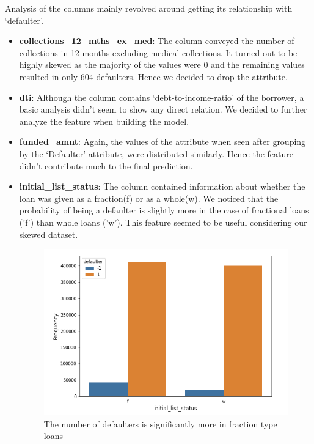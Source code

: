 \documentclass[conference]{IEEEtran}
\begin{document}
Analysis of the columns mainly revolved around getting its relationship with
`defaulter'.
\begin{itemize}
    \item {\bf collections\_12\_mths\_ex\_med}: The column conveyed the number
        of collections in 12 months excluding medical collections. It turned
        out to be highly skewed as the majority of the values were 0 and the
        remaining values resulted in only 604 defaulters. Hence we decided
        to drop the attribute.

    \item {\bf dti}: Although the column contains `debt-to-income-ratio' of
        the borrower, a basic analysis didn't seem to show any direct relation.
        We decided to further analyze the feature when building the model.

    \item {\bf funded\_amnt}: Again, the values of the attribute when seen
        after grouping by the ‘Defaulter’ attribute, were distributed similarly.
        Hence the feature didn’t contribute much to the final prediction.

    \item {\bf initial\_list\_status}: The column contained information about
        whether the loan was given as a fraction(f) or as a whole(w). We
        noticed that the probability of being a defaulter is slightly more in
        the case of fractional loans ('f') than whole loans ('w'). This feature
        seemed to be useful considering our skewed dataset.

        \begin{figure}[ht]
        \center\includegraphics[scale=0.3]{initial_list_status}
            \caption{The number of defaulters is significantly more in fraction type loans}
        \end{figure}


\end{itemize}
\end{document}
